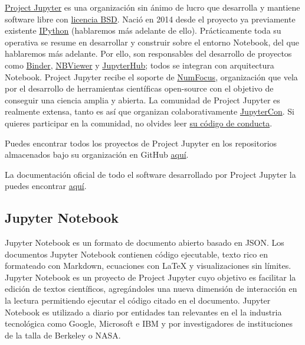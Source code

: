 \documentclass[11pt]{article}
\begin{document}
    \href{https://jupyter.org/about}{Project Jupyter} es una organización
sin ánimo de lucro que desarrolla y mantiene software libre con
\href{https://opensource.org/licenses/BSD-3-Clause}{licencia BSD}. Nació
en 2014 desde el proyecto ya previamente existente
\href{https://ipython.org/}{IPython} (hablaremos más adelante de ello).
Prácticamente toda su operativa se resume en desarrollar y construir
sobre el entorno Notebook, del que hablaremos más adelante. Por ello,
son responsables del desarrollo de proyectos como
\href{https://mybinder.org/}{Binder},
\href{https://nbviewer.jupyter.org/}{NBViewer} y
\href{https://jupyter.org/hub}{JupyterHub}; todos se integran con
arquitectura Notebook. Project Jupyter recibe el soporte de
\href{https://numfocus.org/}{NumFocus}, organización que vela por el
desarrollo de herramientas científicas open-source con el objetivo de
conseguir una ciencia amplia y abierta. La comunidad de Project Jupyter
es realmente extensa, tanto es así que organizan colaborativamente
\href{https://t.co/NjJypi80sj}{JupyterCon}. Si quieres participar en la
comunidad, no olvides leer
\href{https://github.com/jupyter/governance/blob/master/conduct/code_of_conduct.md}{su
código de conducta}.

Puedes encontrar todos los proyectos de Project Jupyter en los
repositorios almacenados bajo su organización en GitHub
\href{https://github.com/jupyter}{aquí}.

La documentación oficial de todo el software desarrollado por Project
Jupyter la puedes encontrar
\href{https://jupyter.org/documentation}{aquí}.

    \subsection{Jupyter Notebook}\label{jupyter-notebook}

    Jupyter Notebook es un formato de documento abierto basado en JSON. Los
documentos Jupyter Notebook contienen código ejecutable, texto rico en
formateado con Markdown, ecuaciones con LaTeX y visualizaciones sin
límites. Jupyter Notebook es un proyecto de Project Jupyter cuyo
objetivo es facilitar la edición de textos científicos, agregándoles una
nueva dimensión de interacción en la lectura permitiendo ejecutar el
código citado en el documento. Jupyter Notebook es utilizado a diario
por entidades tan relevantes en el la industria tecnológica como Google,
Microsoft e IBM y por investigadores de instituciones de la talla de
Berkeley o NASA.
\end{document}
